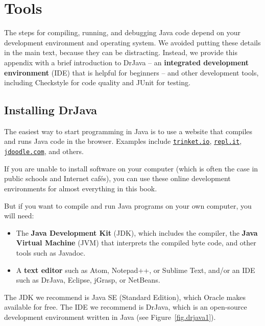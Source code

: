 \chapter{Tools}
\label{tools}


The steps for compiling, running, and debugging Java code depend on your development environment and operating system.
We avoided putting these details in the main text, because they can be distracting.
Instead, we provide this appendix with a brief introduction to DrJava -- an {\bf integrated development environment} (IDE) that is helpful for beginners -- and other development tools, including Checkstyle for code quality and JUnit for testing.


\section{Installing DrJava}
\label{drjava}

The easiest way to start programming in Java is to use a website that compiles and runs Java code in the browser.
Examples include \href{https://trinket.io/}{\tt trinket.io}, \href{https://repl.it/}{\tt repl.it}, \href{https://www.jdoodle.com/}{\tt jdoodle.com}, and others.

If you are unable to install software on your computer (which is often the case in public schools and Internet caf\'{e}s), you can use these online development environments for almost everything in this book.

But if you want to compile and run Java programs on your own computer, you will need:

\begin{itemize}

\item The {\bf Java Development Kit} (JDK), which includes the compiler, the {\bf Java Virtual Machine} (JVM) that interprets the compiled byte code, and other tools such as Javadoc.



\item A {\bf text editor} such as Atom, Notepad++, or Sublime Text, and/or an IDE such as DrJava, Eclipse, jGrasp, or NetBeans.

\end{itemize}

The JDK we recommend is Java SE (Standard Edition), which Oracle makes available for free.
The IDE we recommend is DrJava, which is an open-source development environment written in Java (see Figure~\ref{fig.drjava1}).


